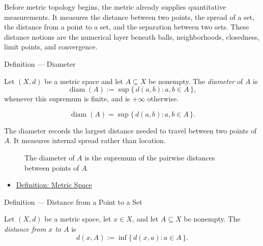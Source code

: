\begin{remark*}[Exposition]
Before metric topology begins, the metric already supplies quantitative
measurements.  It measures the distance between two points, the spread of a
set, the distance from a point to a set, and the separation between two sets.
These distance notions are the numerical layer beneath balls, neighborhoods,
closedness, limit points, and convergence.
\end{remark*}

\begin{definitionbox}{Definition --- Diameter}
\begin{definition}[Diameter]\label{def:metric-diameter}
Let \((X,d)\) be a metric space and let \(A\subseteq X\) be nonempty.  The
\emph{diameter} of \(A\) is
\[
  \operatorname{diam}(A)
  :=
  \sup\{\,d(a,b):a,b\in A\,\},
\]
whenever this supremum is finite, and is \(+\infty\) otherwise.
\end{definition}
\end{definitionbox}

\begin{remark*}
\[
\operatorname{diam}(A)
=
\sup\{\,d(a,b):a,b\in A\,\}.
\]
\end{remark*}

\begin{remark*}[Interpretation]
The diameter records the largest distance needed to travel between two points
of \(A\).  It measures internal spread rather than location.
\end{remark*}

\begin{figure}[htbp]
\centering

\caption{The diameter of \(A\) is the supremum of the pairwise distances
between points of \(A\).}
\label{fig:metric-diameter-distance-set}
\end{figure}

\begin{dependencies}
\begin{itemize}
  \item \hyperref[def:metric-space]{Definition: Metric Space}
\end{itemize}
\end{dependencies}

\begin{definitionbox}{Definition --- Distance from a Point to a Set}
\begin{definition}\label{def:metric-point-set-distance}
Let \((X,d)\) be a metric space, let \(x\in X\), and let
\(A\subseteq X\) be nonempty.  The \emph{distance from \(x\) to \(A\)} is
\[
  d(x,A):=\inf\{\,d(x,a):a\in A\,\}.
\]
\end{definition}
\end{definitionbox}

